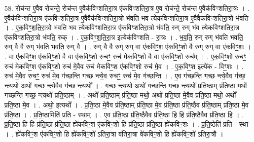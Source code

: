 \documentclass[17pt]{extarticle}
\begin{document}
58. रोच॑न्त ए॒वैव रोच॑न्ते॒ रोच॑न्त ए॒वैक॑विꣳशतिरा॒त्र ए॑कविꣳशतिरा॒त्र ए॒व रोच॑न्ते॒ रोच॑न्त ए॒वैक॑विꣳशतिरा॒त्रः । . ए॒वैक॑विꣳशतिरा॒त्र ए॑कविꣳशतिरा॒त्र ए॒वैवैक॑विꣳशतिरा॒त्रो भ॑वति भव त्येकविꣳशतिरा॒त्र 
ए॒वैवैक॑विꣳशतिरा॒त्रो भ॑वति । . ए॒क॒विꣳ॒॒श॒ति॒रा॒त्रो भ॑वति भव त्येकविꣳशतिरा॒त्र ए॑कविꣳशतिरा॒त्रो भ॑वति॒ रुग् रुग् भ॑व त्येकविꣳशतिरा॒त्र ए॑कविꣳशतिरा॒त्रो भ॑वति॒ रुक् । . ए॒क॒विꣳ॒॒श॒ति॒रा॒त्र इत्येक॑विꣳशति - रा॒त्रः । . भ॒व॒ति॒ रुग् रुग् भ॑वति भवति॒ रुग् वै वै रुग् भ॑वति भवति॒ रुग् वै । . रुग् वै वै रुग् रुग् वा ए॑कविꣳ॒॒श ए॑कविꣳ॒॒शो वै रुग् रुग् वा ए॑कविꣳ॒॒शः । . वा ए॑कविꣳ॒॒श ए॑कविꣳ॒॒शो वै वा ए॑कविꣳ॒॒शो रुचꣳ॒॒ रुच॑ मेकविꣳ॒॒शो वै वा ए॑कविꣳ॒॒शो रुच᳚म् । . ए॒क॒विꣳ॒॒शो रुचꣳ॒॒ रुच॑ मेकविꣳ॒॒श ए॑कविꣳ॒॒शो रुच॑ मे॒वैव रुच॑ मेकविꣳ॒॒श ए॑कविꣳ॒॒शो रुच॑ मे॒व । . ए॒क॒विꣳ॒॒श इत्ये॑क - विꣳ॒॒शः । . रुच॑ मे॒वैव रुचꣳ॒॒ रुच॑ मे॒व ग॑च्छन्ति गच्छ न्त्ये॒व रुचꣳ॒॒ रुच॑ मे॒व ग॑च्छन्ति । . ए॒व ग॑च्छन्ति गच्छ न्त्ये॒वैव ग॑च्छ॒ न्त्यथो॒ अथो॑ गच्छ न्त्ये॒वैव ग॑च्छ॒ न्त्यथो᳚ । . ग॒च्छ॒ न्त्यथो॒ अथो॑ गच्छन्ति गच्छ॒ न्त्यथो᳚ प्रति॒ष्ठाम् प्र॑ति॒ष्ठा मथो॑ गच्छन्ति गच्छ॒ न्त्यथो᳚ प्रति॒ष्ठाम् । . अथो᳚ प्रति॒ष्ठाम् प्र॑ति॒ष्ठा मथो॒ अथो᳚ प्रति॒ष्ठा मे॒वैव प्र॑ति॒ष्ठा मथो॒ अथो᳚ प्रति॒ष्ठा मे॒व । . अथो॒ इत्यथो᳚ । . प्र॒ति॒ष्ठा मे॒वैव प्र॑ति॒ष्ठाम् प्र॑ति॒ष्ठा मे॒व प्र॑ति॒ष्ठा प्र॑ति॒ष्ठैव प्र॑ति॒ष्ठाम् प्र॑ति॒ष्ठा मे॒व प्र॑ति॒ष्ठा । . प्र॒ति॒ष्ठामिति॑ प्रति - स्थाम् । . ए॒व प्र॑ति॒ष्ठा प्र॑ति॒ष्ठैवैव प्र॑ति॒ष्ठा हि हि प्र॑ति॒ष्ठैवैव प्र॑ति॒ष्ठा हि । . प्र॒ति॒ष्ठा हि हि प्र॑ति॒ष्ठा प्र॑ति॒ष्ठा ह्ये॑कविꣳ॒॒श ए॑कविꣳ॒॒शो हि प्र॑ति॒ष्ठा प्र॑ति॒ष्ठा ह्ये॑कविꣳ॒॒शः । . प्र॒ति॒ष्ठेति॑ प्रति - स्था । . ह्ये॑कविꣳ॒॒श ए॑कविꣳ॒॒शो हि ह्ये॑कविꣳ॒॒शो॑ ऽतिरा॒त्रा व॑तिरा॒त्रा वे॑कविꣳ॒॒शो हि ह्ये॑कविꣳ॒॒शो॑ ऽतिरा॒त्रौ । \newline
\end{document}
